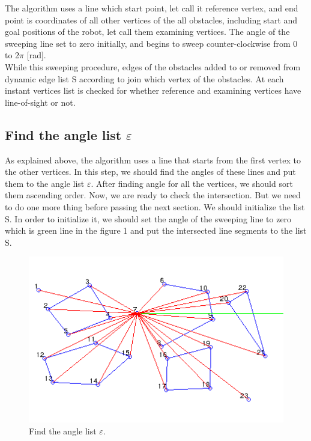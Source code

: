 \documentclass{article}
\begin{document}
The algorithm uses a line which start point, let call it reference vertex, and end point is coordinates of all other vertices of the all obstacles, including start and goal positions of the robot, let call them examining vertices. The angle of the sweeping line set to zero initially, and begins to sweep counter-clockwise from 0 to 2$\pi$ [rad]. 
\\

While this sweeping procedure, edges of the obstacles added to or removed from dynamic edge list S according to join which vertex of the obstacles. At each instant vertices list is checked for whether reference and examining vertices have line-of-sight or not.
\\

\subsection{Find the angle list $\varepsilon$}

As explained above, the algorithm uses a line that starts from the first vertex to the other vertices. In this step, we should find the angles of these lines and put them to the angle list $\varepsilon$. After finding angle for all the vertices, we should sort them ascending order. Now, we are ready to check the intersection. But we need to do one more thing before passing the next section. We should initialize the list S. In order to initialize it, we should set the angle of the sweeping line to zero which is green line in the figure 1 and put the intersected line segments to the list S.

\begin{figure}[!h]
\begin{center}
\includegraphics[scale=0.9]{00}
\caption{Find the angle list $\varepsilon$.}
\end{center}
\end{figure}
\end{document}
